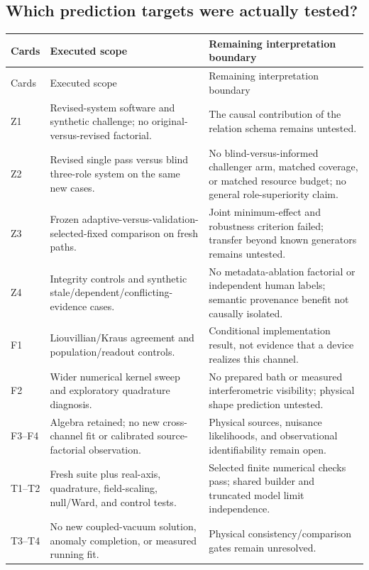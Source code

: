 \subsection{Which prediction targets were actually tested?}
\begin{longtable}{@{}>{\raggedright\arraybackslash}p{.11\linewidth}>{\raggedright\arraybackslash}p{.40\linewidth}>{\raggedright\arraybackslash}p{.42\linewidth}@{}}
\toprule
Cards & Executed scope & Remaining interpretation boundary\\\midrule
\endfirsthead
\toprule Cards & Executed scope & Remaining interpretation boundary\\\midrule\endhead
\bottomrule\endfoot
Z1 & Revised-system software and synthetic challenge; no original-versus-revised factorial. & The causal contribution of the relation schema remains untested.\\
Z2 & Revised single pass versus blind three-role system on the same new cases. & No blind-versus-informed challenger arm, matched coverage, or matched resource budget; no general role-superiority claim.\\
Z3 & Frozen adaptive-versus-validation-selected-fixed comparison on fresh paths. & Joint minimum-effect and robustness criterion failed; transfer beyond known generators remains untested.\\
Z4 & Integrity controls and synthetic stale/dependent/conflicting-evidence cases. & No metadata-ablation factorial or independent human labels; semantic provenance benefit not causally isolated.\\
F1 & Liouvillian/Kraus agreement and population/readout controls. & Conditional implementation result, not evidence that a device realizes this channel.\\
F2 & Wider numerical kernel sweep and exploratory quadrature diagnosis. & No prepared bath or measured interferometric visibility; physical shape prediction untested.\\
F3--F4 & Algebra retained; no new cross-channel fit or calibrated source-factorial observation. & Physical sources, nuisance likelihoods, and observational identifiability remain open.\\
T1--T2 & Fresh suite plus real-axis, quadrature, field-scaling, null/Ward, and control tests. & Selected finite numerical checks pass; shared builder and truncated model limit independence.\\
T3--T4 & No new coupled-vacuum solution, anomaly completion, or measured running fit. & Physical consistency/comparison gates remain unresolved.\\
\end{longtable}


